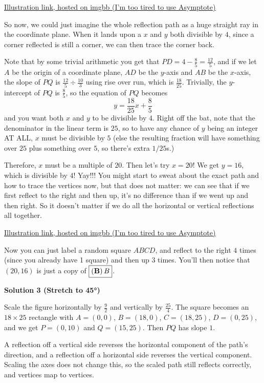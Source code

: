 \begin{enumerate}
 \href{https://ibb.co/VkCbKNT}{Illustration link, hosted on imgbb (I'm too tired to use Asymptote)}

 So now, we could just imagine the whole reflection path as a huge straight ray in the coordinate plane.  When it lands upon a $x$ and $y$ both divisible by $4$, since a corner reflected is still a corner, we can then trace the corner back.

 Note that by some trivial arithmetic you get that $PD=4-\frac{8}{5}=\frac{12}{5}$, and if we let $A$ be the origin of a coordinate plane, $AD$ be the $y$-axis and $AB$ be the $x$-axis, the slope of $PQ$ is $\frac{12}{5}\div\frac{10}{3}$ using rise over run, which is $\frac{18}{25}$.  Trivially, the $y$-intercept of $PQ$ is $\frac{8}{5}$, so the equation of $PQ$ becomes
 \[y=\frac{18}{25}x+\frac{8}{5}\]and you want both $x$ and $y$ to be divisible by $4$.  Right off the bat, note that the denominator in the linear term is $25$, so to have any chance of $y$ being an integer AT ALL, $x$ must be divisible by $5$ (else the resulting fraction will have something over $25$ plus something over $5$, so there's extra $1/25$s.)

 Therefore, $x$ must be a multiple of $20$.  Then let's try $x=20$!  We get $y=16$, which is divisible by $4$!  Yay!!!  You might start to sweat about the exact path and how to trace the vertices now, but that does not matter: we can see that if we first reflect to the right and then up, it's no difference than if we went up and then right.  So it doesn't matter if we do all the horizontal or vertical reflections all together.

 \href{https://ibb.co/fYJc6Ks1}{Illustration link, hosted on imgbb (I'm too tired to use Asymptote)}

 Now you can just label a random square $ABCD$, and reflect to the right $4$ times (since you already have 1 square) and then up $3$ times.  You'll then notice that $(20,16)$ is just a copy of $\boxed{\mathbf{(B)\,\mathnormal{B}}}$.

 



\textbf{Solution 3 (Stretch to 45°)}

Scale the figure horizontally by $\frac{9}{2}$ and vertically by $\frac{25}{4}$. The square becomes an $18 \times 25$ rectangle with $A=(0,0)$, $B=(18,0)$, $C=(18,25)$, $D=(0,25)$, and we get $P=(0,10)$ and $Q=(15,25)$. Then $PQ$ has slope $1$.

 A reflection off a vertical side reverses the horizontal component of the path's direction, and a reflection off a horizontal side reverses the vertical component. Scaling the axes does not change this, so the scaled path still reflects correctly, and vertices map to vertices.


\end{enumerate}
